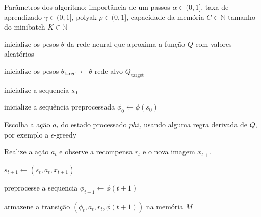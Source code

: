 \begin{algorithm}[H]
    Parâmetros dos algoritmo:
    importância de um passos $\alpha \in (0,1]$,
    taxa de aprendizado $\gamma \in (0,1]$,
    polyak $\rho \in (0,1]$,
    capacidade da memória $C \in \mathbb{N}$
    tamanho do minibatch $K \in \mathbb{N}$


    inicialize os pesos $\theta$ da rede neural que aproxima a função $Q$ com valores aleatórios

    inicialize os pesos $\theta_{\text{target}}  \leftarrow \theta$ rede alvo $Q_{\text{target}}$

     {
        inicialize a sequencia $s_0$

        inicialize a sequência preprocessada $\phi_0 \leftarrow \phi(s_0)$ 
        

         {
            Escolha a ação $a_t$ do estado processado $phi_t$ usando alguma regra derivada de $Q$,
            por exemplo a $\epsilon$-greedy

            Realize a ação $a_t$ e observe a recompensa $r_t$ e o nova imagem $x_{t+1}$
            
            $s_{t+1}  \leftarrow (s_t, a_t, x_{t+1})$   

            preprocesse a sequencia $\phi_{t+1} \leftarrow \phi(t+1)$
            
            armazene a transição $(\phi_t,a_t,r_t,\phi(t+1))$ na memória $M$

            }}
\end{algorithm}
